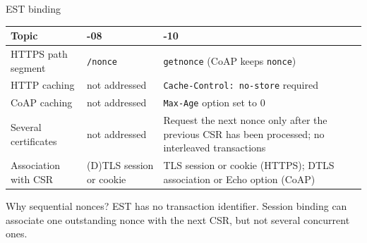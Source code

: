 \documentclass[aspectratio=169,10pt]{beamer}
\begin{document}
\begin{frame}{EST binding}
  \small
  \begin{tabular}{@{}>{\raggedright\arraybackslash}p{3.4cm}>{\raggedright\arraybackslash}p{4.4cm}>{\raggedright\arraybackslash}p{5.0cm}@{}}
    \toprule
    \textbf{Topic} & \textbf{-08} & \textbf{-10}\\
    \midrule
    HTTPS path segment & \texttt{/nonce} & \texttt{getnonce} (CoAP keeps \texttt{nonce})\\[0.15cm]
    HTTP caching & not addressed & \texttt{Cache-Control: no-store} required\\[0.15cm]
    CoAP caching & not addressed & \texttt{Max-Age} option set to 0\\[0.15cm]
    Several certificates & not addressed & Request the next nonce only after the
      previous CSR has been processed; no interleaved transactions\\[0.15cm]
    Association with CSR & (D)TLS session or cookie & TLS session or cookie (HTTPS);
      DTLS association or Echo option (CoAP)\\
    \bottomrule
  \end{tabular}

  \vspace{0.35cm}
  \begin{block}{Why sequential nonces?}
    EST has no transaction identifier. Session binding can associate one
    outstanding nonce with the next CSR, but not several concurrent ones.
  \end{block}
\end{frame}
\end{document}
